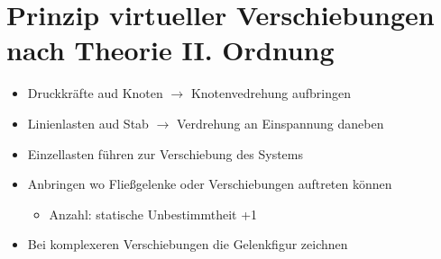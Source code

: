 \documentclass[fleqn,twoside]{article}
\begin{document}
\section{Prinzip virtueller Verschiebungen nach Theorie II. Ordnung}
    \begin{itemize}
        \item Druckkräfte aud Knoten $\rightarrow$ Knotenvedrehung aufbringen
        \item Linienlasten aud Stab $\rightarrow$ Verdrehung an Einspannung daneben
        \item Einzellasten führen zur Verschiebung des Systems
        \item Anbringen wo Fließgelenke oder Verschiebungen auftreten können 
            \begin{itemize}
                \item Anzahl: statische Unbestimmtheit +1
            \end{itemize}
        \item Bei komplexeren Verschiebungen die Gelenkfigur zeichnen
    \end{itemize}
\end{document}
